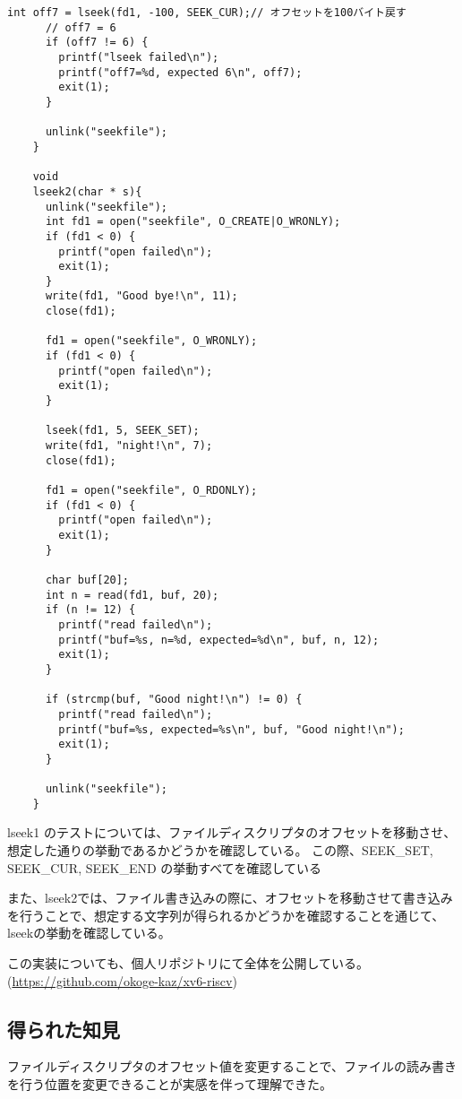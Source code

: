 \documentclass[platex,dvipdfmx, titlepage]{jlreq} %
\begin{document}
\begin{lstlisting}[caption={user/usertests.c}]
      int off7 = lseek(fd1, -100, SEEK_CUR);// オフセットを100バイト戻す
      // off7 = 6
      if (off7 != 6) {
        printf("lseek failed\n");
        printf("off7=%d, expected 6\n", off7);
        exit(1);
      }
    
      unlink("seekfile");
    }
    
    void
    lseek2(char * s){
      unlink("seekfile");
      int fd1 = open("seekfile", O_CREATE|O_WRONLY);
      if (fd1 < 0) {
        printf("open failed\n");
        exit(1);
      }
      write(fd1, "Good bye!\n", 11);
      close(fd1);
    
      fd1 = open("seekfile", O_WRONLY);
      if (fd1 < 0) {
        printf("open failed\n");
        exit(1);
      }
    
      lseek(fd1, 5, SEEK_SET);
      write(fd1, "night!\n", 7);
      close(fd1);
    
      fd1 = open("seekfile", O_RDONLY);
      if (fd1 < 0) {
        printf("open failed\n");
        exit(1);
      }
    
      char buf[20];
      int n = read(fd1, buf, 20);
      if (n != 12) {
        printf("read failed\n");
        printf("buf=%s, n=%d, expected=%d\n", buf, n, 12);
        exit(1);
      }
    
      if (strcmp(buf, "Good night!\n") != 0) {
        printf("read failed\n");
        printf("buf=%s, expected=%s\n", buf, "Good night!\n");
        exit(1);
      }
    
      unlink("seekfile");
    }
\end{lstlisting}

lseek1 のテストについては、ファイルディスクリプタのオフセットを移動させ、想定した通りの挙動であるかどうかを確認している。
この際、SEEK\_SET, SEEK\_CUR, SEEK\_END の挙動すべてを確認している

また、lseek2では、ファイル書き込みの際に、オフセットを移動させて書き込みを行うことで、想定する文字列が得られるかどうかを確認することを通じて、lseekの挙動を確認している。

この実装についても、個人リポジトリにて全体を公開している。(\url{https://github.com/okoge-kaz/xv6-riscv})

\subsection{得られた知見}

ファイルディスクリプタのオフセット値を変更することで、ファイルの読み書きを行う位置を変更できることが実感を伴って理解できた。
\end{document}
